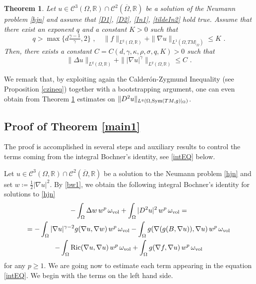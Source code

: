 \documentclass[10pt, a4paper, reqno, oneside]{amsart}
\theoremstyle{plain}
\theoremstyle{definition}
\theoremstyle{plain}
\newtheorem{theorem}[theo]{Theorem}
\theoremstyle{definition}
\theoremstyle{plain}
\renewcommand{\=}{:=}
\begin{document}
\begin{theorem} \label{main2}
Let $u \in \mathcal{C}^3(\Omega,\mathbb{R}) \cap \mathcal{C}^2(\overline{\Omega},\mathbb{R})$ be a solution of the Neumann problem \eqref{hjn} and assume that \eqref{D1}, \eqref{D2}, \eqref{In1}, \eqref{tildeIn2} hold true. Assume that there exist an exponent $q$ and a constant $K>0$ such that
$$
q > \max\big\{d\tfrac{\gamma-1}{\gamma},2\big\} \,\, , \quad
\|f\|_{L^q(\Omega,\mathbb{R})}+\|\nabla u\|_{L^1(\Omega,TM|_{\Omega})}\leq K \,\, .
$$
Then, there exists a constant $C=C(d,\gamma,\kappa,\rho,\sigma,q,K)>0$ such that
\begin{equation}
\|\Delta u\|_{L^q(\Omega,\mathbb{R})}+ \||\nabla u|^\gamma\|_{L^q(\Omega,\mathbb{R})}\leq C \,\, .
\end{equation}
\end{theorem}

We remark that, by exploiting again the Calder\'on-Zygmund Inequality (see Proposition \ref{czineq}) together with a bootstrapping argument, one can even obtain from Theorem \ref{main2} estimates on $\|D^2 u\|_{L^q(\Omega,{\rm Sym}(TM,g)|_{\Omega})}$.

\subsection{Proof of Theorem \ref{main1}} \label{sect_proof1} \hfill \par

The proof is accomplished in several steps and auxiliary results to control the terms coming from the integral Bochner's identity, see \eqref{intEQ} below. \smallskip

Let $u \in \mathcal{C}^3(\Omega,\mathbb{R}) \cap \mathcal{C}^2(\overline{\Omega},\mathbb{R})$ be a solution to the Neumann problem \eqref{hjn} and set $w\coloneqq\tfrac12|\nabla u|^2$. By \eqref{bw1}, we obtain the following integral Bochner's identity for solutions to \eqref{hjn}
\begin{multline} \label{intEQ}
-\int_\Omega \Delta w\,w^p\,\omega_{\mathrm{vol}}
+\int_\Omega |D^2u|^2\,w^p\,\omega_{\mathrm{vol}} = \\
=
-\int_\Omega |\nabla u|^{\gamma-2} g(\nabla u,\nabla w)\,w^p\,\omega_{\mathrm{vol}}
-\int_\Omega g(\nabla (g(B,\nabla u)), \nabla u)\,w^p\,\omega_{\mathrm{vol}} \\
-\int_\Omega {\rm Ric}(\nabla u,\nabla u)\,w^p\,\omega_{\mathrm{vol}} 
+\int_\Omega g(\nabla f,\nabla u)\,w^p\,\omega_{\mathrm{vol}}
\end{multline}
for any $p\geq1$. We are going now to estimate each term appearing in the equation \eqref{intEQ}. We begin with the terms on the left hand side.
\end{document}
